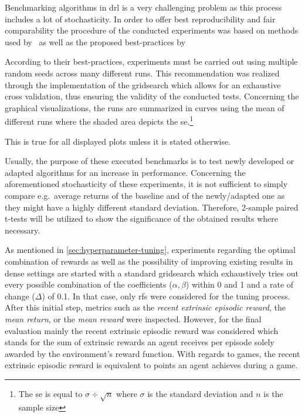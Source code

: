 \documentclass[draft,final]{vutinfth} %
\begin{document}
    Benchmarking algorithms in \gls{drl} is a very challenging problem as this process includes a lot of stochasticity.
    In order to offer best reproducibility and fair comparability the procedure of the conducted experiments was based on methods used by~\cite{burda_large-scale_2018-1} as well as the proposed best-practices by \citeauthor{francois-lavet_introduction_2018}

    According to their best-practices, experiments must be carried out using multiple random seeds across many different runs.
    This recommendation was realized through the implementation of the gridsearch which allows for an exhaustive cross validation, thus ensuring the validity of the conducted tests.
    Concerning the graphical visualizations, the runs are summarized in curves using the mean of different runs where the shaded area depicts the \gls{se}.\footnote{The \gls{se} is equal to $\sigma \div \sqrt{n}$ where $\sigma$ is the standard deviation and $n$ is the sample size}

    This is true for all displayed plots unless it is stated otherwise.

    Usually, the purpose of these executed benchmarks is to test newly developed or adapted algorithms for an increase in performance.
    Concerning the aforementioned stochasticity of these experiments, it is not sufficient to simply compare e.g.\ average returns of the baseline and of the newly/adapted one as they might have a highly different standard deviation.
    Therefore, 2-sample paired t-tests will be utilized to show the significance of the obtained results where necessary.

    As mentioned in \autoref{sec:hyperparameter-tuning}, experiments regarding the optimal combination of rewards as well as the possibility of improving existing results in dense settings are started with a standard gridsearch which exhaustively tries out every possible combination of the coefficients ($\alpha,\beta$) within 0 and 1 and a rate of change ($\Delta$) of 0.1.
    In that case, only \glspl{rf} were considered for the tuning process.
    After this initial step, metrics such as the \textit{recent extrinsic episodic reward}, the \textit{mean return}, or the \textit{mean reward} were inspected.
    However, for the final evaluation mainly the recent extrinsic episodic reward was considered which stands for the sum of extrinsic rewards an agent receives per episode solely awarded by the environment's reward function.
    With regards to games, the recent extrinsic episodic reward is equivalent to points an agent achieves during a game.
\end{document}
